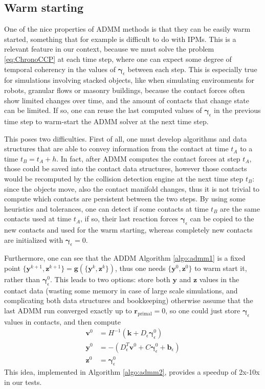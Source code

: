 \documentclass[AMA,STIX1COL]{WileyNJD-v2}
\newcommand{\vect}[1]{\bm{#1}}
\begin{document}
\subsection{Warm starting}

One of the nice properties of ADMM methods is that they can be easily warm started, something that for example is difficult to do with IPMs. 
This is a relevant feature in our context, because we must solve the problem \eqref{eq:ChronoCCP} at each time step, where one can expect some degree of temporal coherency in the values of $\vect{\gamma}_\epsilon$ between each step. This is especially true for simulations involving stacked objects, like when simulating environments for robots, granular flows or masonry buildings, because the contact forces often show limited changes over time, and the amount of contacts that change state can be limited. If so, one can reuse the last computed values of $\vect{\gamma}_\epsilon$ in the previous time step to warm-start the ADMM solver at the next time step.

This poses two difficulties. First of all, one must develop algorithms and data structures that are able to convey information from the contact at time $t_A$ to a time $t_B = t_A+h$. In fact, after ADMM computes the contact forces at step $t_A$, those could be saved into the contact data structures, however those contacts would be recomputed by the collision detection engine at the next time step $t_B$: since the objects move, also the contact manifold changes, thus it is not trivial to compute which contacts are persistent between the two steps. By using some heuristics and tolerances, one can detect if some contacts at time $t_B$ are the same contacts used at time $t_A$, if so, their last reaction forces $\vect{\gamma}_\epsilon$ can be copied to the new contacts and used for the warm starting, whereas completely new contacts are initialized with $\vect{\gamma}_\epsilon = 0$. 

Furthermore, one can see that the ADDM Algorithm \ref{algo:admm1} is a fixed point 
$\{\vect{y}^{k+1},\vect{z}^{k+1}\} = \vect{g} \left(\{\vect{y}^k,\vect{z}^k\}\right)$, thus one needs $\{\vect{y}^0,\vect{z}^0\}$ to warm start it, rather than $\vect{\gamma}_\epsilon^0$. This leads to two options: store both $\vect{y}$ and $\vect{z}$ values in the contact data (wasting some memory in case of large scale simulations, and complicating both data structures and bookkeeping) otherwise assume that the last ADMM run converged exactly up to $\vect{r}_{\text{primal}}=0$, so one could just store $\vect{\gamma}_\epsilon$ values in contacts, and then compute
%
\begin{align}
\vect{v}^0 &= H^{-1}( \vect{k} + D_\epsilon \vect{\gamma}_\epsilon^0) \nonumber \\
\vect{y}^0 &= - (D_\epsilon^T \vect{v}^0 + C \vect{\gamma}_\epsilon^0 + \vect{b}_\epsilon)  \nonumber \\
\vect{z}^0 &= \vect{\gamma}_\epsilon^0 \nonumber
\end{align}
This idea, implemented in Algorithm \ref{algo:admm2}, provides a speedup of 2x-10x in our tests.
\end{document}
